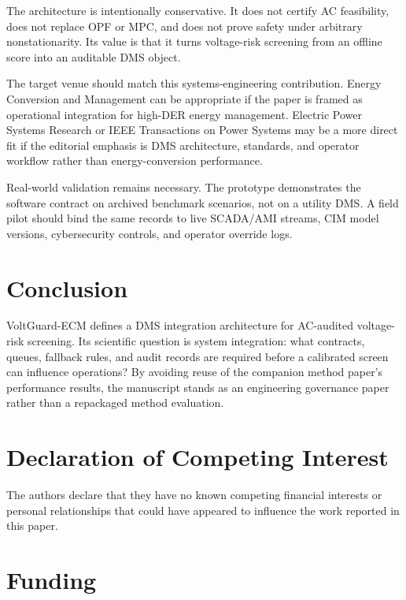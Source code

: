 \documentclass[
  preprint,12pt]{elsarticle}
\begin{document}
The architecture is intentionally conservative. It does not certify AC
feasibility, does not replace OPF or MPC, and does not prove safety
under arbitrary nonstationarity. Its value is that it turns voltage-risk
screening from an offline score into an auditable DMS object.

The target venue should match this systems-engineering contribution.
Energy Conversion and Management can be appropriate if the paper is
framed as operational integration for high-DER energy management.
Electric Power Systems Research or IEEE Transactions on Power Systems
may be a more direct fit if the editorial emphasis is DMS architecture,
standards, and operator workflow rather than energy-conversion
performance.

Real-world validation remains necessary. The prototype demonstrates the
software contract on archived benchmark scenarios, not on a utility DMS.
A field pilot should bind the same records to live SCADA/AMI streams,
CIM model versions, cybersecurity controls, and operator override logs.

\section{Conclusion}\label{conclusion}

VoltGuard-ECM defines a DMS integration architecture for AC-audited
voltage-risk screening. Its scientific question is system integration:
what contracts, queues, fallback rules, and audit records are required
before a calibrated screen can influence operations? By avoiding reuse
of the companion method paper's performance results, the manuscript
stands as an engineering governance paper rather than a repackaged
method evaluation.

\section*{Declaration of Competing
Interest}\label{declaration-of-competing-interest}

The authors declare that they have no known competing financial
interests or personal relationships that could have appeared to
influence the work reported in this paper.

\section*{Funding}\label{funding}
\end{document}
